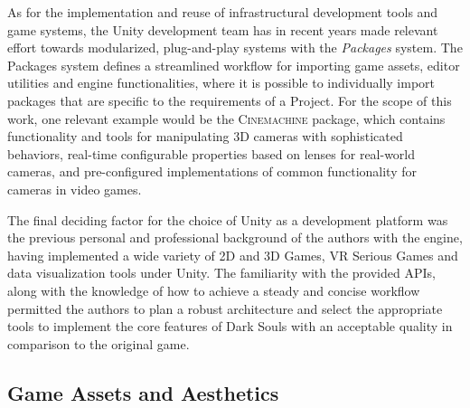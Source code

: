 As for the implementation and reuse of infrastructural development tools and game systems, the Unity development team has in recent years made relevant effort towards modularized, plug-and-play systems with the \emph{Packages} system. The Packages system defines a streamlined workflow for importing game assets, editor utilities and engine functionalities, where it is possible to individually import packages that are specific to the requirements of a Project. For the scope of this work, one relevant example would be the \textsc{Cinemachine} package, which contains functionality and tools for manipulating 3D cameras with sophisticated behaviors, real-time configurable properties based on lenses for real-world cameras, and pre-configured implementations of common functionality for cameras in video games.

The final deciding factor for the choice of Unity as a development platform was the previous personal and professional background of the authors with the engine, having implemented a wide variety of 2D and 3D Games, VR Serious Games and data visualization tools under Unity. The familiarity with the provided APIs, along with the knowledge of how to achieve a steady and concise workflow permitted the authors to plan a robust architecture and select the appropriate tools to implement the core features of Dark Souls with an acceptable quality in comparison to the original game.


\subsection{Game Assets and Aesthetics}

